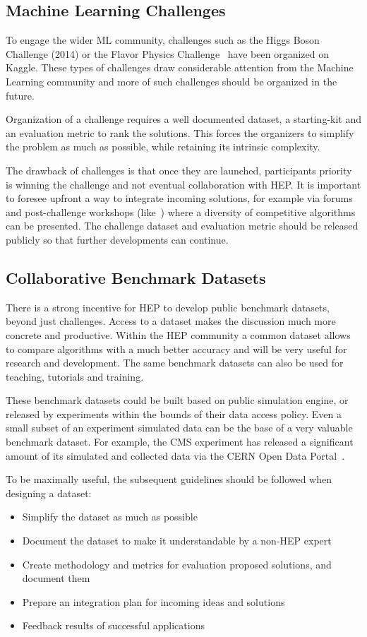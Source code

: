 \subsection{Machine Learning Challenges}

To engage the wider ML community, challenges such as the Higgs Boson Challenge (2014) or the Flavor Physics Challenge~\cite{NIPS:2015:ALEPH,FlavourDataMining} have been organized on Kaggle. These types of challenges draw considerable attention from the Machine Learning community and more of such challenges should be organized in the future.

Organization of a challenge requires a well documented dataset, a starting-kit and an evaluation metric to rank the solutions. This forces the organizers to simplify the problem as much as possible, while retaining its intrinsic complexity.

The drawback of challenges is that once they are launched, participants priority is winning the challenge and not eventual collaboration with HEP. It is important to foresee upfront a way to integrate incoming solutions, for example via forums and post-challenge workshops (like~\cite{FlavourDataMining}) where a diversity of competitive algorithms can be presented. The challenge dataset and evaluation metric should be released publicly so that further developments can continue.

\subsection{Collaborative Benchmark Datasets}
\label{subsec:benchmark}
There is a strong incentive for HEP to develop public benchmark datasets, beyond just challenges. Access to a dataset makes the discussion much more concrete and productive. Within the HEP community a common dataset allows to compare algorithms with a much better accuracy and will be very useful for research and development. The same benchmark datasets can also be used for teaching, tutorials and training.

These benchmark datasets could be built based on public simulation engine, or released by experiments within the bounds of their data access policy. Even a small subset of an experiment simulated data can be the base of a very valuable benchmark dataset. For example, the CMS experiment has released a significant amount of its simulated and collected data via the CERN Open Data Portal~\cite{opendata}.

To be maximally useful, the subsequent guidelines should be followed when designing a dataset:
\begin{itemize}
 \item Simplify the dataset as much as possible
 \item Document the dataset to make it understandable by a non-HEP expert
 \item Create methodology and metrics for evaluation proposed solutions, and document them
 \item Prepare an integration plan for incoming ideas and solutions
 \item Feedback results of successful applications
\end{itemize}

